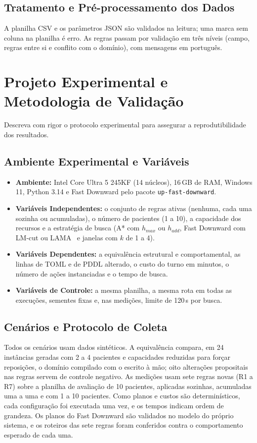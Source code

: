 \documentclass[11pt,a4paper]{article}
\begin{document}
\subsection{Tratamento e Pré-processamento dos Dados}
A planilha CSV e os parâmetros JSON são validados na leitura; uma marca sem coluna na planilha é erro. As regras passam por validação em três níveis (campo, regras entre si e conflito com o domínio), com mensagens em português.

\section{Projeto Experimental e Metodologia de Validação}

\begin{instrucao}
Descreva com rigor o protocolo experimental para assegurar a reprodutibilidade dos resultados.
\end{instrucao}

\subsection{Ambiente Experimental e Variáveis}
\begin{itemize}
    \item \textbf{Ambiente:} Intel Core Ultra 5 245KF (14 núcleos), 16\,GB de RAM, Windows 11, Python 3.14 e Fast Downward pelo pacote \texttt{up-fast-downward}.
    \item \textbf{Variáveis Independentes:} o conjunto de regras ativas (nenhuma, cada uma sozinha ou acumuladas), o número de pacientes (1 a 10), a capacidade dos recursos e a estratégia de busca (A* com $h_{max}$ ou $h_{add}$, Fast Downward com LM-cut ou LAMA~\cite{lama} e janelas com $k$ de 1 a 4).
    \item \textbf{Variáveis Dependentes:} a equivalência estrutural e comportamental, as linhas de TOML e de PDDL alterado, o custo do turno em minutos, o número de ações instanciadas e o tempo de busca.
    \item \textbf{Variáveis de Controle:} a mesma planilha, a mesma rota em todas as execuções, sementes fixas e, nas medições, limite de 120\,s por busca.
\end{itemize}

\subsection{Cenários e Protocolo de Coleta}
Todos os cenários usam dados sintéticos. A equivalência compara, em 24 instâncias geradas com 2 a 4 pacientes e capacidades reduzidas para forçar reposições, o domínio compilado com o escrito à mão; oito alterações propositais nas regras servem de controle negativo. As medições usam sete regras novas (R1 a R7) sobre a planilha de avaliação de 10 pacientes, aplicadas sozinhas, acumuladas uma a uma e com 1 a 10 pacientes. Como planos e custos são determinísticos, cada configuração foi executada uma vez, e os tempos indicam ordem de grandeza. Os planos do Fast Downward são validados no modelo do próprio sistema, e os roteiros das sete regras foram conferidos contra o comportamento esperado de cada uma.
\end{document}
